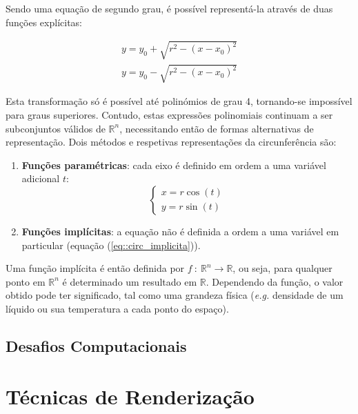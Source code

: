 Sendo uma equação de segundo grau, é possível representá-la através de duas funções explícitas:

\begin{eqnarray}
		y = y_0 + \sqrt{r^2 - (x - x_0)^2} \\
		y = y_0 - \sqrt{r^2 - (x - x_0)^2}
\end{eqnarray}

Esta transformação só é possível até polinómios de grau 4, tornando-se impossível para graus superiores. Contudo, estas expressões polinomiais continuam a ser subconjuntos válidos de $\mathbb{R}^n$, necessitando então de formas alternativas de representação. Dois métodos e respetivas representações da circunferência são:

\begin{enumerate}
	\item \textbf{Funções paramétricas}: cada eixo é definido em ordem a uma variável adicional $t$:
	\begin{equation}
		\left\{\begin{array}{l}
			x = r\cos(t) \\
			y = r\sin(t)
		\end{array}\right.
	\label{eq::circ_parametrica}
	\end{equation}
	
	\item \textbf{Funções implícitas}: a equação não é definida a ordem a uma variável em particular (equação (\ref{eq::circ_implicita})).
\end{enumerate}

Uma função implícita é então definida por $f~:~\mathbb{R}^n \longrightarrow \mathbb{R}$, ou seja, para qualquer ponto em $\mathbb{R}^n$ é determinado um resultado em $\mathbb{R}$. Dependendo da função, o valor obtido pode ter significado, tal como uma grandeza física (\textit{e.g.} densidade de um líquido ou sua temperatura a cada ponto do espaço).



\subsection{Desafios Computacionais}
\label{ssec::arte:implicitas:desafios}



\section{Técnicas de Renderização}
\label{sec::arte:render}

